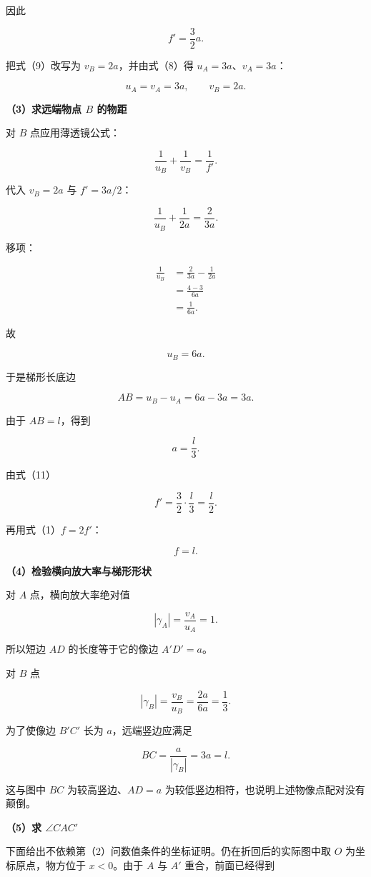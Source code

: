 \documentclass[12pt,a4paper,UTF8]{ctexart}
\begin{document}
因此

\[
f'=\frac32a.
\tag{11}
\]

把式（9）改写为 \(v_B=2a\)，并由式（8）得 \(u_A=3a\)、\(v_A=3a\)：

\[
\boxed{u_A=v_A=3a,\qquad v_B=2a}.
\tag{12}
\]

\textbf{（3）求远端物点 \(B\) 的物距}

对 \(B\) 点应用薄透镜公式：

\[
\frac1{u_B}+\frac1{v_B}=\frac1{f'}.
\tag{13}
\]

代入 \(v_B=2a\) 与 \(f'=3a/2\)：

\[
\frac1{u_B}+\frac1{2a}=\frac{2}{3a}.
\]

移项：

\[
\begin{aligned}
\frac1{u_B}
&=\frac{2}{3a}-\frac1{2a}\\
&=\frac{4-3}{6a}\\
&=\frac1{6a}.
\end{aligned}
\]

故

\[
\boxed{u_B=6a}.
\tag{14}
\]

于是梯形长底边

\[
AB=u_B-u_A=6a-3a=3a.
\tag{15}
\]

由于 \(AB=l\)，得到

\[
\boxed{a=\frac l3}.
\tag{16}
\]

由式（11）

\[
f'=\frac32\cdot\frac l3=\frac l2.
\]

再用式（1）\(f=2f'\)：

\[
\boxed{f=l}.
\tag{17}
\]

\textbf{（4）检验横向放大率与梯形形状}

对 \(A\) 点，横向放大率绝对值

\[
|\gamma_A|=\frac{v_A}{u_A}=1.
\tag{18}
\]

所以短边 \(AD\) 的长度等于它的像边 \(A'D'=a\)。

对 \(B\) 点

\[
|\gamma_B|=\frac{v_B}{u_B}
=\frac{2a}{6a}
=\frac13.
\tag{19}
\]

为了使像边 \(B'C'\) 长为 \(a\)，远端竖边应满足

\[
BC=\frac{a}{|\gamma_B|}=3a=l.
\tag{20}
\]

这与图中 \(BC\) 为较高竖边、\(AD=a\)
为较低竖边相符，也说明上述物像点配对没有颠倒。

\textbf{（5）求 \(\angle CAC'\)}

下面给出不依赖第（2）问数值条件的坐标证明。仍在折回后的实际图中取 \(O\)
为坐标原点，物方位于 \(x<0\)。由于 \(A\) 与 \(A'\) 重合，前面已经得到
\end{document}
